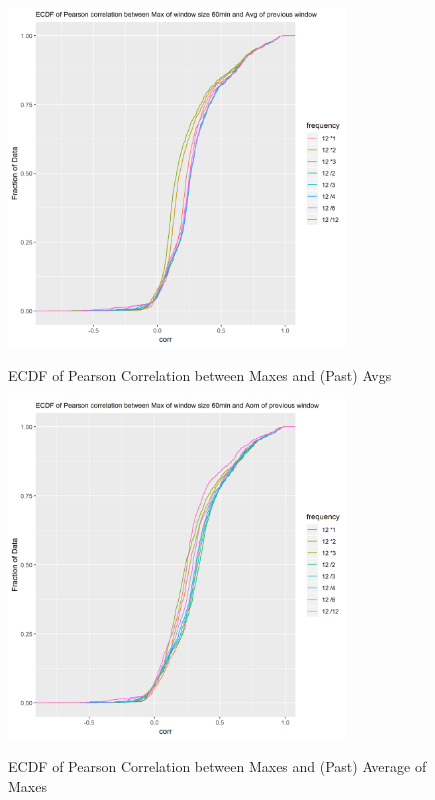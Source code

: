\documentclass{article}
\begin{document}
\begin{figure}[htbp]
\caption{ECDF of Pearson Correlation between Maxes and (Past) Avgs}
\centering
\includegraphics[width = 0.8\textwidth]{ECDFofPearsoncorrelationbetweenMaxofwindowsize60minandAvgofpreviouswindow}
\label{fig:fig1.1.5}
\end{figure}

\begin{figure}[htbp]
\caption{ECDF of Pearson Correlation between Maxes and (Past) Average of Maxes}
\centering
\includegraphics[width = 0.8\textwidth]{ECDFofPearsoncorrelationbetweenMaxofwindowsize60minandAomofpreviouswindow}
\label{fig:fig1.1.6}
\end{figure}
\end{document}
